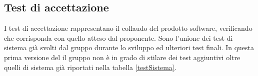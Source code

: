 \subsection{Test di accettazione}
I test di accettazione rappresentano il collaudo del prodotto software, verificando che corrisponda con quello atteso dal proponente. Sono l'unione dei test di sistema già svolti dal gruppo durante lo sviluppo ed ulteriori test finali.
In questa prima versione del \PdQv{} il gruppo non è in grado di stilare dei test aggiuntivi oltre quelli di sistema già riportati nella tabella \ref{testSistema}.
